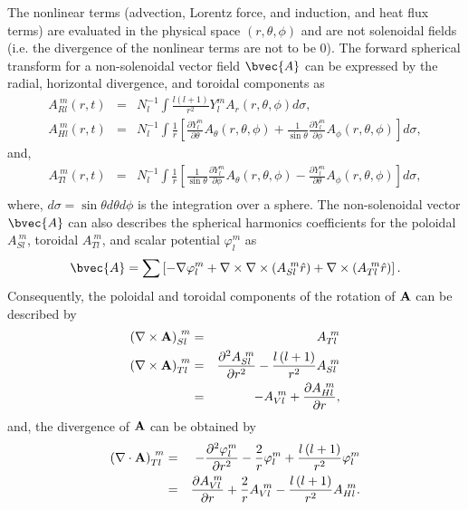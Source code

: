 The nonlinear terms (advection, Lorentz force, and induction, and heat flux terms) are evaluated in the physical space $(r, \theta, \phi)$ and are not solenoidal fields (i.e. the divergence of the nonlinear terms are not to be 0). The forward spherical transform for a non-solenoidal vector field $\bvec{A}$ can be expressed by the radial, horizontal divergence, and toroidal components as
%
\begin{eqnarray}
A_{Rl}^{\ m} (r,t)  &=& N_{l}^{-1} \int \frac{l \left( l+1 \right)}{r^{2}} Y_{l}^{m} A_{r}(r, \theta, \phi) d\sigma, 
\label{eq:radial_forward} \\
A_{Hl}^{\ m} (r,t) 
 &=& N_{l}^{-1} \int  \frac{1}{r} \left[ \frac{\partial Y_{l}^{m} }{\partial \theta} A_{\theta}(r, \theta, \phi)
 + \frac{1}{\sin \theta} \frac{\partial Y_{l}^{m} }{\partial \phi} A_{\phi}(r, \theta, \phi) \right] d\sigma,
\label{eq:horizontal_div_forward}
\end{eqnarray}
and, 
\begin{eqnarray}
A_{Tl}^{\ m} (r,t) 
 &=& N_{l}^{-1} \int  \frac{1}{r} \left[ \frac{1}{\sin \theta}  \frac{\partial Y_{l}^{m} }{\partial \phi} A_{\theta}(r, \theta, \phi)
 - \frac{\partial Y_{l}^{m} }{\partial \theta} A_{\phi}(r, \theta, \phi) \right] d\sigma,
\label{eq:toroidal_forward} \\
\end{eqnarray}
%
where, $d \sigma = \sin \theta d \theta d\phi$ is the integration over a sphere. 
The non-solenoidal vector $\bvec{A}$ can also describes the spherical harmonics coefficients for the poloidal $A_{Sl}^{\ m}$, toroidal $A_{Tl}^{\ m}$, and scalar potential $\varphi_{l}^{m}$ as
%
\begin{eqnarray}
\bvec{A} = \sum \left[ -\nabla \varphi_{l}^{m} 
+ \nabla \times \nabla \times \left(A_{Sl}^{\ m} \hat{r} \right) 
+  \nabla \times \left(A_{Tl}^{\ m} \hat{r} \right) \right].
\end{eqnarray}
%
Consequently, the poloidal and toroidal components of the rotation of $\bf{A}$ can be described by
%
\begin{eqnarray}
\left( \nabla \times \bf{A} \right)_{Sl}^{\ m} &=& A_{Tl}^{\ m} \\
\left( \nabla \times \bf{A} \right)_{Tl}^{\ m}
 &=& \frac{\partial^{2} A_{Sl}^{\ m}}{\partial r^{2}} - \frac{l \left( l+1 \right)}{r^{2}} A_{Sl}^{\ m} 
 \nonumber \\
 &=& - A_{Vl}^{\ m} + \frac{\partial A_{Hl}^{\ m}}{\partial r},
\end{eqnarray}
%
and, the divergence of $\bf{A}$ can be obtained by
%
\begin{eqnarray}
\left( \nabla \cdot \bf{A} \right)_{Tl}^{\ m}
 &=& - \frac{\partial^{2} \varphi_{l}^{m}}{\partial r^{2}} 
    - \frac{2}{r} \varphi_{l}^{m} 
    + \frac{l \left( l+1 \right)}{r^{2}} \varphi_{l}^{m} 
 \nonumber \\
 &=& \frac{\partial A_{Vl}^{\ m}}{\partial r} + \frac{2}{r} A_{Vl}^{\ m}
 - \frac{l \left( l+1 \right)}{r^{2}} A_{Hl}^{\ m}.
\end{eqnarray}
%

